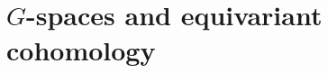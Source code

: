 \documentclass[a4paper]{amsart}
\theoremstyle{plain}
\newtheorem{prop}[thm]{Proposition}
\theoremstyle{definition}
\newtheorem{rem}[thm]{Remark}
\newcommand{\op}{\mathcal}
\newcommand{\dgca}{\mathsf{Dgca}}
\newcommand{\mC}{{\mathcal{C}}}
\newcommand{\mT}{{\mathcal{T}}}
\begin{document}
% 
% 


\section{\texorpdfstring{$G$}{G}-spaces and equivariant cohomology}
\end{document}
